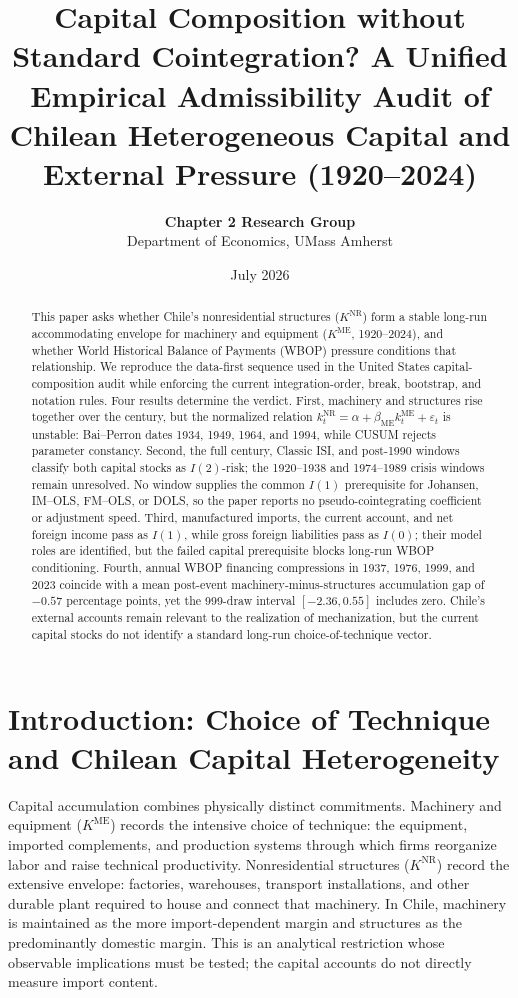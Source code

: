 \documentclass[11pt,a4paper]{article}
\title{\textbf{Capital Composition without Standard Cointegration? A Unified Empirical Admissibility Audit of Chilean Heterogeneous Capital and External Pressure (1920--2024)}}
\author{\textbf{Chapter 2 Research Group} \\ Department of Economics, UMass Amherst}
\date{July 2026}
\begin{document}
\maketitle

\begin{abstract}
This paper asks whether Chile's nonresidential structures (\(K^{\mathrm{NR}}\)) form a stable long-run accommodating envelope for machinery and equipment (\(K^{\mathrm{ME}}\), 1920--2024), and whether World Historical Balance of Payments (WBOP) pressure conditions that relationship. We reproduce the data-first sequence used in the United States capital-composition audit while enforcing the current integration-order, break, bootstrap, and notation rules. Four results determine the verdict. First, machinery and structures rise together over the century, but the normalized relation \(k_t^{\mathrm{NR}}=\alpha+\beta_{\mathrm{ME}}k_t^{\mathrm{ME}}+\varepsilon_t\) is unstable: Bai--Perron dates 1934, 1949, 1964, and 1994, while CUSUM rejects parameter constancy. Second, the full century, Classic ISI, and post-1990 windows classify both capital stocks as \(I(2)\)-risk; the 1920--1938 and 1974--1989 crisis windows remain unresolved. No window supplies the common \(I(1)\) prerequisite for Johansen, IM--OLS, FM--OLS, or DOLS, so the paper reports no pseudo-cointegrating coefficient or adjustment speed. Third, manufactured imports, the current account, and net foreign income pass as \(I(1)\), while gross foreign liabilities pass as \(I(0)\); their model roles are identified, but the failed capital prerequisite blocks long-run WBOP conditioning. Fourth, annual WBOP financing compressions in 1937, 1976, 1999, and 2023 coincide with a mean post-event machinery-minus-structures accumulation gap of \(-0.57\) percentage points, yet the 999-draw interval \([-2.36,0.55]\) includes zero. Chile's external accounts remain relevant to the realization of mechanization, but the current capital stocks do not identify a standard long-run choice-of-technique vector.
\end{abstract}

\FloatBarrier
\section{Introduction: Choice of Technique and Chilean Capital Heterogeneity}

Capital accumulation combines physically distinct commitments. Machinery and equipment (\(K^{\mathrm{ME}}\)) records the intensive choice of technique: the equipment, imported complements, and production systems through which firms reorganize labor and raise technical productivity. Nonresidential structures (\(K^{\mathrm{NR}}\)) record the extensive envelope: factories, warehouses, transport installations, and other durable plant required to house and connect that machinery. In Chile, machinery is maintained as the more import-dependent margin and structures as the predominantly domestic margin. This is an analytical restriction whose observable implications must be tested; the capital accounts do not directly measure import content.
\end{document}
